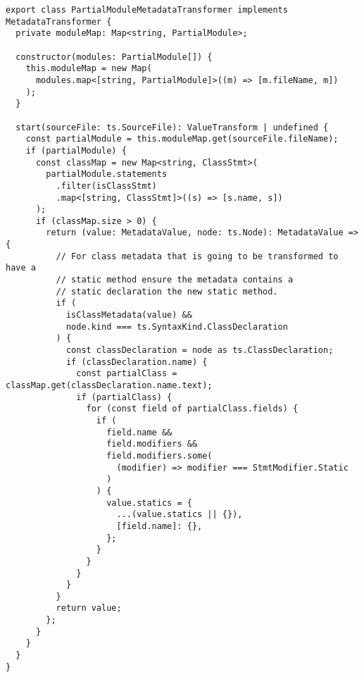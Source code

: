\begin{verbatim}
export class PartialModuleMetadataTransformer implements MetadataTransformer {
  private moduleMap: Map<string, PartialModule>;

  constructor(modules: PartialModule[]) {
    this.moduleMap = new Map(
      modules.map<[string, PartialModule]>((m) => [m.fileName, m])
    );
  }

  start(sourceFile: ts.SourceFile): ValueTransform | undefined {
    const partialModule = this.moduleMap.get(sourceFile.fileName);
    if (partialModule) {
      const classMap = new Map<string, ClassStmt>(
        partialModule.statements
          .filter(isClassStmt)
          .map<[string, ClassStmt]>((s) => [s.name, s])
      );
      if (classMap.size > 0) {
        return (value: MetadataValue, node: ts.Node): MetadataValue => {
          // For class metadata that is going to be transformed to have a
          // static method ensure the metadata contains a
          // static declaration the new static method.
          if (
            isClassMetadata(value) &&
            node.kind === ts.SyntaxKind.ClassDeclaration
          ) {
            const classDeclaration = node as ts.ClassDeclaration;
            if (classDeclaration.name) {
              const partialClass = classMap.get(classDeclaration.name.text);
              if (partialClass) {
                for (const field of partialClass.fields) {
                  if (
                    field.name &&
                    field.modifiers &&
                    field.modifiers.some(
                      (modifier) => modifier === StmtModifier.Static
                    )
                  ) {
                    value.statics = {
                      ...(value.statics || {}),
                      [field.name]: {},
                    };
                  }
                }
              }
            }
          }
          return value;
        };
      }
    }
  }
}
\end{verbatim}
